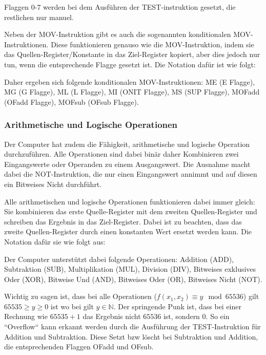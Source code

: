 \documentclass{scrartcl}
\begin{document}
Flaggen $0$-$7$ werden bei dem Ausführen der TEST-instruktion gesetzt, die restlichen nur manuel.

Neben der MOV-Instruktion gibt es auch die sogenannten konditionalen MOV-Instruktionen.
Diese funktionieren genauso wie die MOV-Instruktion, indem sie das Quellen-Register/Konstante in das Ziel-Register kopiert, aber dies jedoch nur tun, wenn die entsprechende Flagge gesetzt ist.
Die Notation dafür ist wie folgt:


Daher ergeben sich folgende konditionalen MOV-Instruktionen: ME (E Flagge), MG (G Flagge), ML (L Flagge), MI (ONIT Flagge), MS (SUP Flagge), MOFadd (OFadd Flagge), MOFsub (OFsub Flagge).



\subsubsection{\label{section:arthimatik}Arithmetische und Logische Operationen}

Der Computer hat zudem die Fähigkeit, arithmetische und logische Operation durchzuführen.
Alle Operationen sind dabei binär daher Kombinieren zwei Eingangswerte oder Operanden zu einem Ausgangswert.
Die Ausnahme macht dabei die NOT-Instruktion, die nur einen Eingangswert annimmt und auf diesen ein Bitweises Nicht durchführt.

Alle arithmetischen und logische Operationen funktionieren dabei immer gleich:
Sie kombinieren das erste Quelle-Register mit dem zweiten Quellen-Register und schreiben das Ergebnis in das Ziel-Register.
Dabei ist zu beachten, dass das zweite Quellen-Register durch einen konstanten Wert ersetzt werden kann.
Die Notation dafür sie wie folgt aus:


Der Computer unterstützt dabei folgende Operationen:
Addition (ADD), Subtraktion (SUB), Multiplikation (MUL), Division (DIV), Bitweises exklusives Oder (XOR), Bitweise Und (AND), Bitweises Oder (OR), Bitweises Nicht (NOT).


Wichtig zu sagen ist, dass bei alle Operationen ($f(x_1, x_2) \equiv y \mod 65536$) gilt $65535 \ge y \ge 0$ ist wo bei gilt $y \in \mathbb{N}$.
Der springende Punk ist, dass bei einer Rechnung wie $65535 + 1$ das Ergebnis nicht $65536$ ist, sondern $0$.
So ein “Overflow“ kann erkannt werden durch die Ausführung der TEST-Instruktion für Addition und Subtraktion. Diese Setzt bzw löscht bei Subtraktion und Addition, die entsprechenden Flaggen OFadd und OFsub. 
\end{document}
